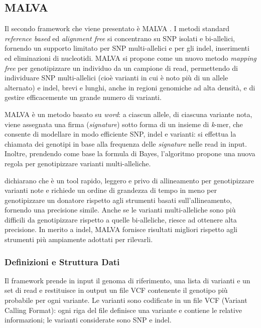 \documentclass[../main.tex]{subfiles}
\begin{document}
\subsection{MALVA}
\label{malva}

Il secondo framework che viene presentato è MALVA \cite{bernardini2019malva}. I metodi standard \textit{reference based} ed \textit{alignment free} si concentrano su SNP isolati e bi-allelici, fornendo un supporto limitato per SNP multi-allelici e per gli indel, inserimenti ed eliminazioni di nucleotidi. MALVA si propone come un nuovo metodo \textit{mapping free} per genotipizzare un individuo da un campione di read, permettendo di individuare SNP multi-allelici (cioè varianti in cui è noto più di un allele alternato) e indel, brevi e lunghi, anche in regioni genomiche ad alta densità, e di gestire efficacemente un grande numero di varianti. 

MALVA è un metodo basato su \textit{word}: a ciascun allele, di ciascuna variante nota, viene assegnata una firma (\textit{signature}) sotto forma di un insieme di \textit{k}-mer, che consente di modellare in modo efficiente SNP, indel e varianti: si effettua la chiamata dei genotipi in base alla frequenza delle \textit{signature} nelle read in input. Inoltre, prendendo come base la formula di Bayes, l'algoritmo propone una nuova regola per genotipizzare varianti multi-alleliche.

\cite{bernardini2019malva} dichiarano che è un tool rapido, leggero e privo di allineamento per genotipizzare varianti note e richiede un ordine di grandezza di tempo in meno per genotipizzare un donatore rispetto agli strumenti basati sull'allineamento, fornendo una precisione simile. Anche se le varianti multi-alleliche sono più difficili da genotipizzare rispetto a quelle bi-alleliche, riesce ad ottenere alta precisione. In merito a indel, MALVA fornisce risultati migliori rispetto agli strumenti più ampiamente adottati per rilevarli. 


\subsubsection{Definizioni e Struttura Dati}

Il framework prende in input il genoma di riferimento, una lista di varianti e un set di read e restituisce in output un file VCF contenente il genotipo più probabile per ogni variante. Le varianti sono codificate in un file VCF (Variant Calling Format): ogni riga del file definisce una variante e contiene le relative informazioni; le varianti considerate sono SNP e indel.
\end{document}
